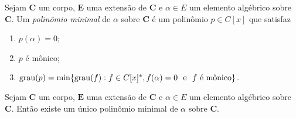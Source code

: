 \begin{defi}
	Sejam $\bm C$ um corpo, $\bm E$ uma extensão de $\bm C$ e $\alpha \in E$ um elemento algébrico sobre $\bm C$. Um \emph{polinômio minimal} de $\alpha$ sobre $\bm C$ é um polinômio $p \in C[x]$ que satisfaz
	\begin{enumerate}
	\item $p(\alpha) = 0$;
	\item $p$ é mônico;
	\item $\operatorname{grau}(p) = \min\{\operatorname{grau}(f) : f \in C[x]^*, f(\alpha)=0 \text{\ \ e\ \ } f \text{\ é mônico}\}$.
	\end{enumerate}
\end{defi}

\begin{prop}
	Sejam $\bm C$ um corpo, $\bm E$ uma extensão de $\bm C$ e $\alpha \in E$ um elemento algébrico sobre $\bm C$. Então existe um único polinômio minimal de $\alpha$ sobre $\bm C$.
\end{prop}
